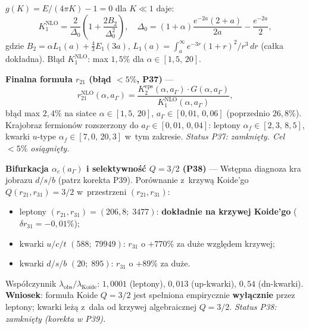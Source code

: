 \begin{problem}
\begin{description}[leftmargin=2em, labelindent=0pt]
  $g(K) = E/(4\pi K) - 1 = 0$ dla $K \ll 1$ daje:
  \begin{equation}\label{eq:K1-NLO}
      K_1^\mathrm{NLO} = \frac{2}{\Delta_0}\!\left(1 + \frac{2B_2}{\Delta_0^2}\right),
      \quad
      \Delta_0 = (1{+}\alpha)\frac{e^{-2a}(2{+}a)}{2a} - \frac{e^{-2a}}{2},
  \end{equation}
  gdzie $B_2 = \alpha L_1(a) + \tfrac{4}{3}E_1(3a)$,
  $L_1(a) = \int_a^\infty e^{-3r}(1{+}r)^2/r^3\,dr$ (ca\l{}ka dok\l{}adna).
  B\l{}\k{a}d $K_1^\mathrm{NLO}$: max $1{,}5\%$ dla $\alpha \in [1{,}5,\,20]$.
  \par
  \textbf{Finalna formu\l{}a $r_{21}$ (b\l{}\k{a}d $<5\%$, P37)} ---
  \begin{equation}\label{eq:r21-NLO-final}
      r_{21}^\mathrm{NLO}(\alpha, a_\Gamma)
      = \frac{K_2^\mathrm{eps}(\alpha, a_\Gamma)\cdot G(\alpha, a_\Gamma)}
             {K_1^\mathrm{NLO}(\alpha, a_\Gamma)},
  \end{equation}
  b\l{}\k{a}d max $2{,}4\%$ na siatce $\alpha \in [1{,}5,\,20]$,
  $a_\Gamma \in [0{,}01,\,0{,}06]$ (poprzednio $26{,}8\%$).
  Krajobraz fermion\'ow rozszerzony do $a_\Gamma \in [0{,}01,\,0{,}04]$:
  leptony $\alpha_f \in [2{,}3,\,8{,}5]$, kwarki $u$-type
  $\alpha_f \in [7{,}0,\,20{,}3]$ w~tym zakresie.
  \textit{Status P37: zamkni\k{e}ty. Cel $<5\%$ osi\k{a}gni\k{e}ty.}
  \par
  \textbf{Bifurkacja $\alpha_c(a_\Gamma)$ i selektywno\'s\'c $Q=3/2$ (P38)} ---
  Wst\k{e}pna diagnoza kra jobrazu $d/s/b$ (patrz korekta P39).
  Por\'ownanie z~krzyw\k{a} Koide'go $Q(r_{21}, r_{31}) = 3/2$
  w~przestrzeni $(r_{21}, r_{31})$:
  \begin{itemize}[nosep]
    \item leptony $(r_{21},r_{31}) = (206{,}8;\;3477)$:
          \textbf{dok\l{}adnie na krzywej Koide'go} ($\delta r_{31} = -0{,}01\%$);
    \item kwarki $u/c/t$ $(588;\;79949)$:
          $r_{31}$ o $+770\%$ za du\.ze wzgl\k{e}dem krzywej;
    \item kwarki $d/s/b$ $(20;\;895)$:
          $r_{31}$ o $+89\%$ za du\.ze.
  \end{itemize}
  Wsp\'o\l{}czynnik $\lambda_\mathrm{obs}/\lambda_\mathrm{Koide}$:
  $1{,}0001$ (leptony), $0{,}013$ (up-kwarki), $0{,}54$ (dn-kwarki).
  \textbf{Wniosek}: formu\l{}a Koide $Q=3/2$ jest spe\l{}niona
  empirycznie \textbf{wy\l{}\k{a}cznie} przez leptony; kwarki
  le\.z\k{a} z~dala od krzywej algebraicznej $Q=3/2$.
  \textit{Status P38: zamkni\k{e}ty (korekta w P39).}
  \par

\end{description}
\end{problem}
